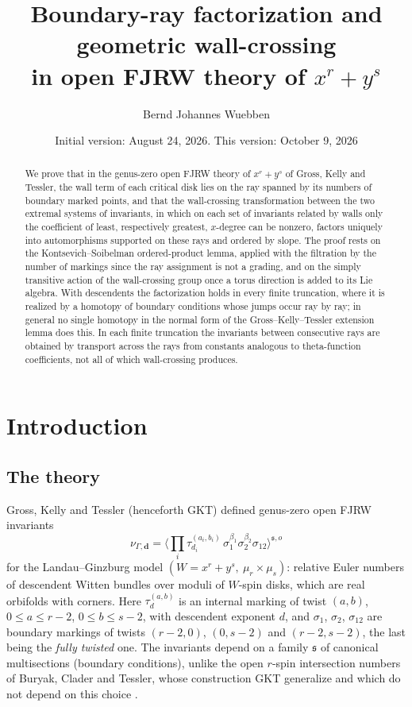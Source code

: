 \documentclass[11pt]{amsart}
\title[Boundary-ray factorization in open FJRW theory]{Boundary-ray
factorization and geometric wall-crossing\\ in open FJRW theory of
$x^{r}+y^{s}$}
\author{Bernd Johannes Wuebben}
\date{Initial version: August 24, 2026. This version: October 9, 2026}
\theoremstyle{definition}
\theoremstyle{remark}
\begin{document}
\begin{abstract}
We prove that in the genus-zero open FJRW theory of $x^r+y^s$ of Gross, Kelly
and Tessler, the wall term of each critical disk lies on the ray spanned by
its numbers of boundary marked points, and that the wall-crossing
transformation between the two extremal systems of invariants, in which on each set of invariants related by walls only the coefficient of least, respectively greatest, $x$-degree can be nonzero, factors uniquely into automorphisms
supported on these rays and ordered by slope.  The proof rests on the
Kontsevich--Soibelman ordered-product lemma, applied with the filtration by
the number of markings since the ray assignment is not a grading, and on the
simply transitive action of the wall-crossing group once a torus direction
is added to its Lie algebra.  With descendents the factorization holds in
every finite truncation, where it is realized by a homotopy of boundary
conditions whose jumps occur ray by ray; in general no single homotopy in
the normal form of the Gross--Kelly--Tessler extension lemma does this.  In
each finite truncation the invariants between consecutive rays are obtained
by transport across the rays from constants analogous to theta-function
coefficients, not all of which wall-crossing produces.
\end{abstract}

\maketitle
\enlargethispage{3pt}

\section{Introduction}
\label{sec:intro}

\subsection{The theory}
\label{ssec:theory}
Gross, Kelly and Tessler \cite{GKT} (henceforth GKT) defined genus-zero open
FJRW invariants
\[
\nu_{\Gamma,\mathbf d}
=\Big\langle\prod_{i}\tau_{d_{i}}^{(a_{i},b_{i})}\,
\sigma_{1}^{\beta_{1}}\sigma_{2}^{\beta_{2}}\sigma_{12}\Big\rangle^{\mathfrak s,o}
\]
for the Landau--Ginzburg model $(W=x^{r}+y^{s},\ \mu_{r}\times\mu_{s})$: relative
Euler numbers of descendent Witten bundles over moduli of $W$-spin disks, which are
real orbifolds with corners. Here $\tau_{d}^{(a,b)}$ is an internal marking of
twist $(a,b)$, $0\le a\le r-2$, $0\le b\le s-2$, with descendent exponent $d$, and
$\sigma_1$, $\sigma_2$, $\sigma_{12}$ are boundary markings of twists $(r{-}2,0)$,
$(0,s{-}2)$ and $(r{-}2,s{-}2)$, the last being the \emph{fully twisted} one.  The
invariants depend on a family $\mathfrak s$
of canonical multisections (boundary conditions), unlike the open $r$-spin
intersection numbers of Buryak, Clader and Tessler, whose construction GKT
generalize and which do not depend on this choice \cite[Thm.~3.17]{BCT21}.
\end{document}

